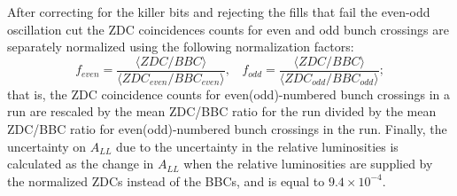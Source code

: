 After correcting for the killer bits and rejecting the fills that fail the
even-odd oscillation cut the ZDC coincidences counts for even and odd bunch
crossings are separately normalized using the following normalization factors:
%
\begin{equation}
  f_{even} = \frac{\langle ZDC/BBC \rangle}{\langle ZDC_{even}/BBC_{even} \rangle}, ~~~~
  f_{odd} = \frac{\langle ZDC/BBC \rangle}{\langle ZDC_{odd}/BBC_{odd} \rangle};
\end{equation}
%
that is, the ZDC coincidence counts for even(odd)-numbered bunch crossings in a
run are rescaled by the mean ZDC/BBC ratio for the run divided by the mean
ZDC/BBC ratio for even(odd)-numbered bunch crossings in the run. Finally, the
uncertainty on $A_{LL}$ due to the uncertainty in the relative luminosities is
calculated as the change in \(A_{LL}\) when the relative luminosities are
supplied by the normalized ZDCs instead of the BBCs, and is equal to
$9.4\times10^{-4}$.

